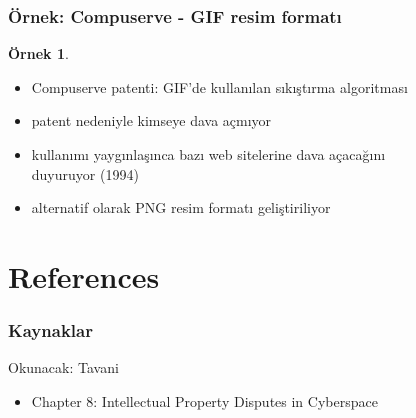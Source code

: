 \documentclass[dvipsnames]{beamer}
\theoremstyle{definition}
\theoremstyle{example}
\newtheorem{ornek}[theorem]{Örnek}
\theoremstyle{plain}
\begin{document}
\begin{frame}
  \frametitle{Örnek: Compuserve - GIF resim formatı}

  \begin{ornek}
    \begin{itemize}
      \item Compuserve patenti: GIF'de kullanılan sıkıştırma algoritması
      \item patent nedeniyle kimseye dava açmıyor
      \item kullanımı yaygınlaşınca bazı web sitelerine dava açacağını\\
        duyuruyor (1994)

      \pause
      \medskip
      \item alternatif olarak PNG resim formatı geliştiriliyor
    \end{itemize}
  \end{ornek}
\end{frame}

\section*{References}

\begin{frame}
  \frametitle{Kaynaklar}

  \begin{block}{Okunacak: Tavani}
    \begin{itemize}
      \item Chapter 8: \alert{Intellectual Property Disputes in Cyberspace}
    \end{itemize}
  \end{block}
\end{frame}
\end{document}
